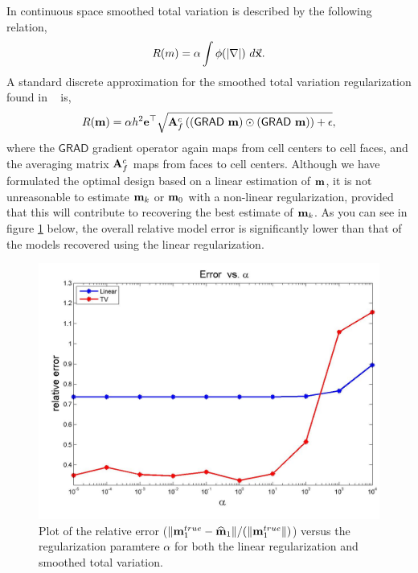 \documentclass[11pt]{article}
\newcommand{\bfA}	{{\bf{A}}}
\newcommand{\bfe}	{{\bf{e}}}
\newcommand{\bfm}	{{\bf{m}}}
\newcommand {\vx}    {\vec {\bf x}}
\newcommand{\grad}	{\ensuremath {{\bf{ \nabla}}}}
\newcommand{\GRADh}  {{\textsf{GRAD}}} %
\newcommand{\bfmhat}    {{\widehat{\bfm}}}
\begin{document}
In continuous space smoothed total variation is described by the following relation,
\begin{equation}
		R(m) = \alpha \int  \phi(|\grad |) \ d\vx.
\end{equation} 
A standard discrete 
approximation for the smoothed total variation regularization found in ~\cite{Ascher2006} is, 
\begin{equation}
\label{regsd}
R(\bfm) = \alpha h^2 \bfe^{\top} \sqrt{ \bfA_{f}^{c} \left( (\GRADh\ \bfm) \odot (\GRADh\ \bfm) \right)  + \epsilon},
\end{equation}
where the $\GRADh$ gradient operator again maps from cell centers to cell faces, and the averaging matrix $\bfA_{f}^{c}$ maps from faces to cell centers. 
Although we have formulated the optimal design based on a linear estimation of $\bfm$, it is not unreasonable to estimate $\bfm_k$ or $\bfm_0$ with a non-linear regularization, provided that this will contribute to recovering the best estimate of $\bfm_k$. As you can see in figure \ref{fig:erro1} below, the overall relative model error is significantly lower than that of the models recovered using the linear regularization. 
%
\begin{figure}[!h]
\begin{center}
\iwidth=180mm
\includegraphics[width=.8\iwidth]{figures/newFigs/exp2-error1}
\end{center}
\caption{Plot of the relative error ($\|\bfm_1^{true}-\bfmhat_1\|/(    \|\bfm^{true}_1\|)$) versus the regularization paramtere $\alpha$ for both the linear regularization and smoothed total variation. }
	\label{fig:erro1}
\end{figure} 
\end{document}
